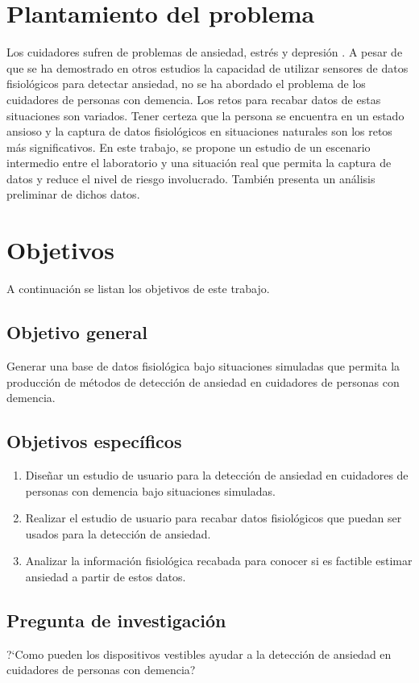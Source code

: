 \section{Plantamiento del problema}
Los cuidadores sufren de problemas de ansiedad, estr\'es y depresi\'on \citep{Joling2014}. A pesar de que se ha demostrado en otros estudios la capacidad de utilizar sensores de datos fisiol\'ogicos para detectar ansiedad, no se ha abordado el problema de los cuidadores de personas con demencia. Los retos para recabar datos de estas situaciones son variados. Tener certeza que la persona se encuentra en un estado ansioso y la captura de datos fisiol\'ogicos en situaciones naturales son los retos m\'as significativos. En este trabajo, se propone un estudio de un escenario intermedio entre el laboratorio y una situaci\'on real que permita la captura de datos y reduce el nivel de riesgo involucrado. Tambi\'en presenta un an\'alisis preliminar de dichos datos.
\section{Objetivos}
	A continuaci\'on se listan los objetivos de este trabajo.
\subsection{Objetivo general}
	Generar una base de datos fisiol\'ogica bajo situaciones simuladas que permita la producci\'on de m\'etodos de detecci\'on de ansiedad en cuidadores de personas con demencia.
\subsection{Objetivos espec\'ificos}
	\begin{enumerate}
		\item Dise\~nar un estudio de usuario para la detecci\'on de ansiedad en cuidadores de personas con demencia bajo situaciones simuladas.
		\item Realizar el estudio de usuario para recabar datos fisiol\'ogicos que puedan ser usados para la detecci\'on de ansiedad.
		\item Analizar la informaci\'on fisiol\'ogica recabada para conocer si es factible estimar ansiedad a partir de estos datos.
	\end{enumerate}
\subsection{Pregunta de investigaci\'on}
	?`Como pueden los dispositivos vestibles ayudar a la detecci\'on de ansiedad en cuidadores de personas con demencia?
